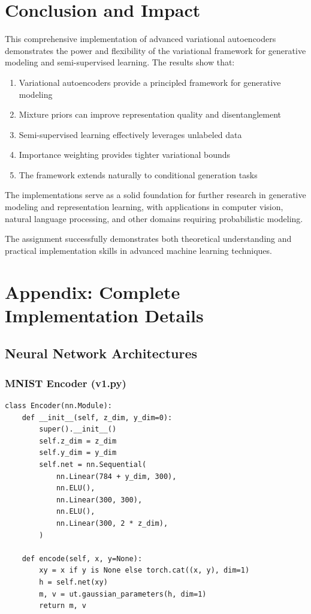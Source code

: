 \documentclass{article}
\begin{document}
\section{Conclusion and Impact}

This comprehensive implementation of advanced variational autoencoders demonstrates the power and flexibility of the variational framework for generative modeling and semi-supervised learning. The results show that:

\begin{enumerate}
\item Variational autoencoders provide a principled framework for generative modeling
\item Mixture priors can improve representation quality and disentanglement
\item Semi-supervised learning effectively leverages unlabeled data
\item Importance weighting provides tighter variational bounds
\item The framework extends naturally to conditional generation tasks
\end{enumerate}

The implementations serve as a solid foundation for further research in generative modeling and representation learning, with applications in computer vision, natural language processing, and other domains requiring probabilistic modeling.

The assignment successfully demonstrates both theoretical understanding and practical implementation skills in advanced machine learning techniques.

\section{Appendix: Complete Implementation Details}

\subsection{Neural Network Architectures}

\subsubsection{MNIST Encoder (v1.py)}

\begin{verbatim}
class Encoder(nn.Module):
    def __init__(self, z_dim, y_dim=0):
        super().__init__()
        self.z_dim = z_dim
        self.y_dim = y_dim
        self.net = nn.Sequential(
            nn.Linear(784 + y_dim, 300),
            nn.ELU(),
            nn.Linear(300, 300),
            nn.ELU(),
            nn.Linear(300, 2 * z_dim),
        )

    def encode(self, x, y=None):
        xy = x if y is None else torch.cat((x, y), dim=1)
        h = self.net(xy)
        m, v = ut.gaussian_parameters(h, dim=1)
        return m, v
\end{verbatim}
\end{document}
